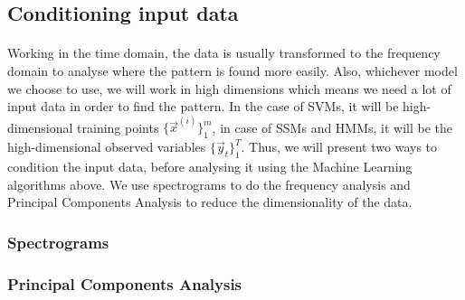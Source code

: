\subsection{Conditioning input data}
\paragraph{}
	Working in the time domain, the data is usually transformed to the frequency domain to analyse where the pattern is found more easily. Also, whichever model we choose to use, we will work in high dimensions which means we need a lot of input data in order to find the pattern. In the case of SVMs, it will be high-dimensional training points $\{\vec x^{(i)}\}_1^m$, in case of SSMs and HMMs, it will be the high-dimensional observed variables $\{\vec y_t\}_1^T$. Thus, we will present two ways to condition the input data, before analysing it using the Machine Learning algorithms above. We use spectrograms to do the frequency analysis and Principal Components Analysis to reduce the dimensionality of the data.
\subsubsection{Spectrograms}
\paragraph{}
	

\subsubsection{Principal Components Analysis}
\paragraph{}
	
